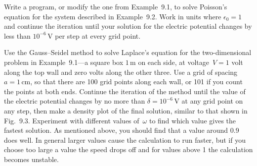 \documentclass[12pt]{article}
\begin{document}
\par
\bigskip
{}\par
\noindent\hrulefill


\begin{exercises}


\exercise Write a program, or modify the one from Example~9.1, to solve
  Poisson's equation for the system described in Example~9.2.  Work in
  units where $\epsilon_0=1$ and continue the iteration until your solution
  for the electric potential changes by less than $10^{-6}\,$V per step at
  every grid point.



\exercise Use the Gauss--Seidel method to solve Laplace's equation for
  the two-dimensional problem in Example~9.1---a square box $1\,$m on each
  side, at voltage~$V=1$ volt along the top wall and zero volts along the
  other three.  Use a grid of spacing $a=1\,$cm, so that there are 100 grid
  points along each wall, or 101 if you count the points at both ends.
  Continue the iteration of the method until the value of the electric
  potential changes by no more than $\delta=10^{-6}\,$V at any grid point
  on any step, then make a density plot of the final solution, similar to
  that shown in Fig.~9.3.  Experiment with different values of~$\omega$ to
  find which value gives the fastest solution.  As mentioned above, you
  should find that a value around 0.9 does well.  In general larger values
  cause the calculation to run faster, but if you choose too large a value
  the speed drops off and for values above 1 the calculation becomes
  unstable.



\end{exercises}
\end{document}
